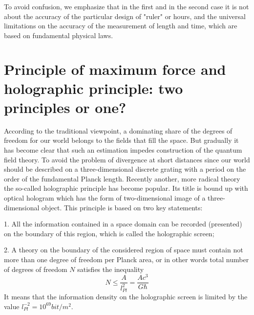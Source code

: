 \documentclass [12pt]{article}
\begin{document}
To avoid confusion, we emphasize that in the first and in the second case it is not about the accuracy of the particular design of "ruler" or hours, and the universal limitations on the accuracy of the measurement of length and time, which are based on fundamental physical laws.

\section{Principle of maximum force and holographic principle: two principles or one?}

According to the traditional viewpoint,  a dominating  share of the degrees of freedom for our world belongs to the fields that fill the space. But gradually it has become clear  that such an estimation impedes construction of the quantum field  theory. To avoid the problem of divergence at short distances since our world should  be described on a three-dimensional discrete grating  with a period on the order of the fundamental Planck length. Recently another, more radical theory  the so-called holographic principle \cite{s21,s22}  has become popular. Its title is bound up with optical hologram which has the form of two-dimensional image of a three-dimensional object. This principle is based on two key statements:

1. All the information contained in a space domain  can be  recorded (presented) on the boundary of this region, which is called the holographic screen;

2. A theory on the boundary of the considered region of space must contain not more than one degree of freedom per Planck area, or in other words total number of degrees of freedom $N$  satisfies the inequality
\begin{equation}\label{e22}
  N \le \frac{A}{{l_{Pl}^2}} = \frac{{A{c^3}}}{{G\hbar }}
\end{equation}
It means that the information density on the holographic screen is limited by the value  $l_{Pl}^{ - 2} = {10^{69}}bit/{m^2}$.
\end{document}
